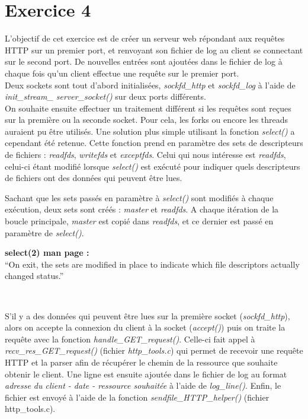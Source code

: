 \section{Exercice 4}
L'objectif de cet exercice est de créer un serveur web répondant aux requêtes HTTP sur un premier port, et renvoyant son fichier de log au client se connectant sur le second port. De nouvelles entrées sont ajoutées dans le fichier de log à chaque fois qu'un client effectue une requête sur le premier port.\\

Deux sockets sont tout d'abord initialisées, \emph{sockfd\_http} et \emph{sockfd\_log} à l'aide de \emph{init\_stream\_ server\_socket()} sur deux ports différents.\\

On souhaite ensuite effectuer un traitement différent si les requêtes sont reçues sur la première ou la seconde socket. Pour cela, les forks ou encore les threads auraient pu être utilisés. Une solution plus simple utilisant la fonction \emph{select()} a cependant été retenue. Cette fonction prend en paramètre des sets de descripteurs de fichiers : \emph{readfds}, \emph{writefds} et \emph{exceptfds}. Celui qui nous intéresse est \emph{readfds}, celui-ci étant modifié lorsque \emph{select()} est exécuté pour indiquer quels descripteurs de fichiers ont des données qui peuvent être lues.\\

\begin{mdframed}[backgroundcolor=lightblue, linecolor=darkblue]
Sachant que les sets passés en paramètre à \emph{select()} sont modifiés à chaque exécution, deux sets sont créés : \emph{master} et \emph{readfds}. A chaque itération de la boucle principale, \emph{master} est copié dans \emph{readfds}, et ce dernier est passé en paramètre de \emph{select()}.

\begin{mdframed}[backgroundcolor=lightblue2, linecolor=darkblue]
\textbf{select(2) man page :}\\
``On exit, the sets are modified in place to indicate which file descriptors actually changed status.''
\end{mdframed}
\end{mdframed}
\

S'il y a des données qui peuvent être lues sur la première socket (\emph{sockfd\_http}), alors on accepte la connexion du client à la socket (\emph{accept()}) puis on traite la requête avec la fonction \emph{handle\_GET\_request()}. Celle-ci fait appel à \emph{recv\_res\_GET\_request()} (fichier \emph{http\_tools.c}) qui permet de recevoir une requête HTTP et la parser afin de récupérer le chemin de la ressource que souhaite obtenir le client. Une ligne est ensuite ajoutée dans le fichier de log au format \emph{adresse du client - date - ressource souhaitée} à l'aide de \emph{log\_line()}. Enfin, le fichier est envoyé à l'aide de la fonction \emph{sendfile\_HTTP\_helper()} (fichier http\_tools.c).\\

